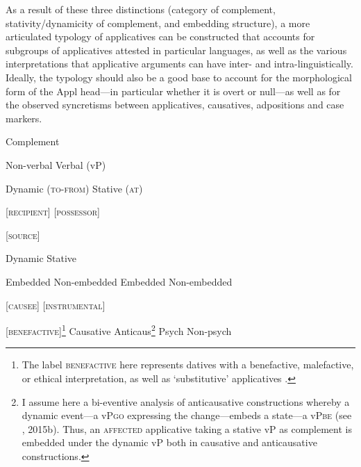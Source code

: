 \documentclass[output=paper,modfonts,nonflat]{langsci/langscibook}
\begin{document}
As a result of these three distinctions (category of complement, stativity/dynamicity of complement, and embedding structure), a more articulated typology of applicatives can be constructed that accounts for subgroups of applicatives attested in particular languages, as well as the various interpretations that applicative arguments can have inter- and intra-linguistically. Ideally, the typology should also be a good base to account for the morphological form of the Appl head—in particular whether it is overt or null—as well as for the observed syncretisms between applicatives, causatives, adpositions and case markers.

        Complement

        Non-verbal                  Verbal (vP)


Dynamic (\textsc{to-from})  Stative (\textsc{at})                  

[\textsc{recipient}]           [\textsc{possessor}]

[\textsc{source}]                     

                Dynamic                                 Stative

    Embedded         Non-embedded      Embedded           Non-embedded

     [\textsc{causee}]       [\textsc{instrumental}]  

                                      [\textsc{benefactive}]\footnote{The label \textsc{benefactive} here represents datives with a benefactive, malefactive, or ethical interpretation, as well as ‘substitutive’ applicatives \citep{Peterson2007}.}   Causative   Anticaus\footnote{I assume here a bi-eventive analysis of anticausative constructions whereby a dynamic event—a vP\textsc{go} expressing the change—embeds a state—a vP\textsc{be} (see \citealt{Cuervo2003}, 2015b). Thus, an \textsc{affected} applicative taking a stative vP as complement is embedded under the dynamic vP both in causative and anticausative constructions.}  Psych   Non-psych        
\end{document}
